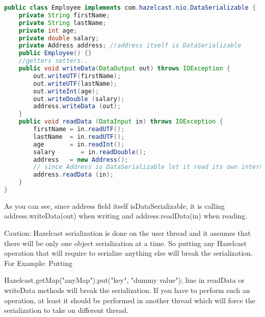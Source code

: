 \begin{lstlisting}[language=java]
public class Employee implements com.hazelcast.nio.DataSerializable {
    private String firstName;
    private String lastName;
    private int age;
    private double salary;
    private Address address; //address itself is DataSerializable
    public Employee() {}
    //getters setters..
    public void writeData(DataOutput out) throws IOException {
        out.writeUTF(firstName);
        out.writeUTF(lastName);
        out.writeInt(age);
        out.writeDouble (salary);
        address.writeData (out);
    }
    public void readData (DataInput in) throws IOException {
        firstName = in.readUTF();
        lastName  = in.readUTF();
        age       = in.readInt();
        salary       = in.readDouble();
        address   = new Address();
        // since Address is DataSerializable let it read its own internal state
        address.readData (in);
    }
}
\end{lstlisting}
As you can see, since address field itself isDataSerializable, it is calling address.writeData(out) when writing and address.readData(in) when reading.

Caution: Hazelcast serialization is done on the user thread and it assumes that there will be only one object serialization at a time. So putting any Hazelcast operation that will require to serialize anything else will break the serialization. For Example: Putting

Hazelcast.getMap("anyMap").put("key", "dummy value");
line in readData or writeData methods will break the serialization. If you have to perform such an operation, at least it should be performed in another thread which will force the serialization to take on different thread.